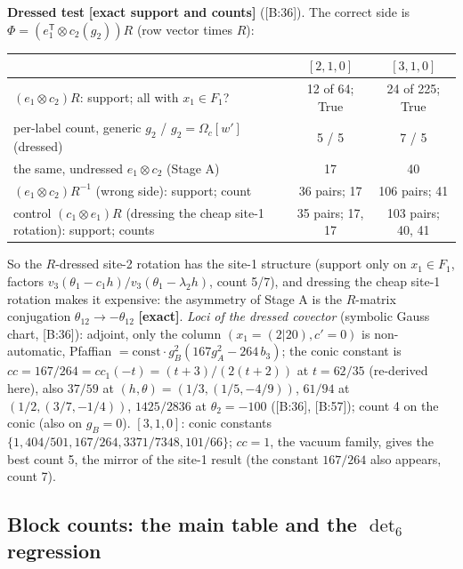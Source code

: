 \documentclass[10pt]{article}
\newcommand{\cl}[2]{\textsf{[#1:#2]}}
\newcommand{\tg}[1]{\textbf{[#1]}}
\newcommand{\Om}{\Omega}
\begin{document}
\textbf{Dressed test} \tg{exact support and counts} (\cl{B}{36}). The correct side is $\Phi=(e_1^{\mathsf T}\otimes c_2(g_2))R$ (row vector times $R$):
\begin{center}\small\begin{tabular}{@{}lcc@{}}\toprule
 & $[2,1,0]$ & $[3,1,0]$ \\\midrule
$(e_1\otimes c_2)R$: support; all with $x_1\in F_1$? & 12 of 64; True & 24 of 225; True \\
per-label count, generic $g_2$ / $g_2=\Om_c[w']$ (dressed) & 5 / 5 & 7 / 5 \\
the same, undressed $e_1\otimes c_2$ (Stage A) & 17 & 40 \\
$(e_1\otimes c_2)R^{-1}$ (wrong side): support; count & 36 pairs; 17 & 106 pairs; 41 \\
control $(c_1\otimes e_1)R$ (dressing the cheap site-1 rotation): support; counts & 35 pairs; 17, 17 & 103 pairs; 40, 41 \\\bottomrule
\end{tabular}\end{center}
So the $R$-dressed site-2 rotation has the site-1 structure (support only on $x_1\in F_1$, factors $v_3(\theta_1-c_1h)/v_3(\theta_1-\lambda_2h)$, count 5/7), and dressing the cheap site-1 rotation makes it expensive: the asymmetry of Stage A is the $R$-matrix conjugation $\theta_{12}\to-\theta_{12}$ \tg{exact}. \emph{Loci of the dressed covector} (symbolic Gauss chart, \cl{B}{36}): adjoint, only the column $(x_1=(2|20),c'=0)$ is non-automatic, Pfaffian $=\mathrm{const}\cdot g_B^2(167g_A^2-264\,b_3)$; the conic constant is $cc=167/264=cc_1(-t)=(t+3)/(2(t+2))$ at $t=62/35$ (re-derived here), also $37/59$ at $(h,\theta)=(1/3,(1/5,-4/9))$, $61/94$ at $(1/2,(3/7,-1/4))$, $1425/2836$ at $\theta_2=-100$ (\cl{B}{36}, \cl{B}{57}); count 4 on the conic (also on $g_B=0$). $[3,1,0]$: conic constants $\{1,404/501,167/264,3371/7348,101/66\}$; $cc=1$, the vacuum family, gives the best count 5, the mirror of the site-1 result (the constant $167/264$ also appears, count 7).

\subsection{Block counts: the main table and the $\det_6$ regression}\label{sec:Bblocks}
\end{document}
